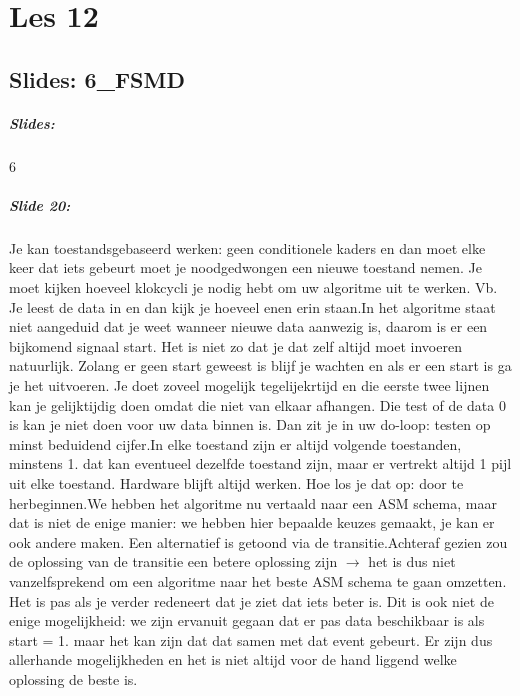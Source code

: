 \documentclass[10pt,a4paper]{book}
\begin{document}
\chapter{Les 12}

\section{Slides: 6\_FSMD}



\paragraph{Slides:} 6

\paragraph{Slide 20:} Je kan toestandsgebaseerd werken: geen conditionele kaders en dan moet elke keer dat iets gebeurt moet je noodgedwongen een nieuwe toestand nemen. Je moet kijken hoeveel klokcycli je nodig hebt om uw algoritme uit te werken. Vb. Je leest de data in en dan kijk je hoeveel enen erin staan.In het algoritme staat niet aangeduid dat je weet wanneer nieuwe data aanwezig is, daarom is er een bijkomend signaal start. Het is niet zo dat je dat zelf altijd moet invoeren natuurlijk. Zolang er geen start geweest is blijf je wachten en als er een start is ga je het uitvoeren. Je doet zoveel mogelijk tegelijekrtijd en die eerste twee lijnen kan je gelijktijdig doen omdat die niet van elkaar afhangen. Die test of de data 0 is kan je niet doen voor uw data binnen is. Dan zit je in uw do-loop: testen op minst beduidend cijfer.In elke toestand zijn er altijd volgende toestanden, minstens 1. dat kan eventueel dezelfde toestand zijn, maar er vertrekt altijd 1 pijl uit elke toestand. Hardware blijft altijd werken. Hoe los je dat op: door te herbeginnen.We hebben het algoritme nu vertaald naar een ASM schema, maar dat is niet de enige manier: we hebben hier bepaalde keuzes gemaakt, je kan er ook andere maken. Een alternatief is getoond via de transitie.Achteraf gezien zou de oplossing van de transitie een betere oplossing zijn $\rightarrow$ het is dus niet vanzelfsprekend om een algoritme naar het beste ASM schema te gaan omzetten. Het is pas als je verder redeneert dat je ziet dat iets beter is. Dit is ook niet de enige mogelijkheid: we zijn ervanuit gegaan dat er pas data beschikbaar is als start = 1. maar het kan zijn dat dat samen met dat event gebeurt. Er zijn dus allerhande mogelijkheden en het is niet altijd voor de hand liggend welke oplossing de beste is.
\end{document}
